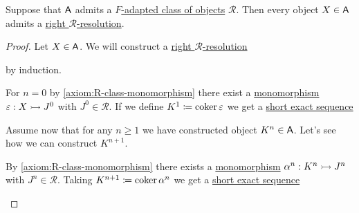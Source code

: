 \documentclass[../../../main]{subfiles}
\begin{document}
\begin{lemma}
  Suppose that \(\mathsf{A}\) admits a \hyperref[def:adapted-class-of-objects]{\(F\)-adapted class of objects} \(\mathcal{R}\).
  Then every object \(X \in \mathsf{A}\) admits a \hyperref[def:right-R-resolution]{right \(\mathcal{R}\)-resolution}.
\end{lemma}
\begin{proof}
  Let \(X \in \mathsf{A}\).
  We will construct a \hyperref[def:right-R-resolution]{right \(\mathcal{R}\)-resolution}
  \begin{center}
  \end{center}
  by induction.

  For \(n = 0\) by \ref{axiom:R-class-monomorphism} there exist a \hyperref[def:mono-epi-morphism]{monomorphism} \(\varepsilon: X \rightarrowtail J^{0}\) with \(J^{0} \in \mathcal{R}\).
  If we define \(K^{1} \coloneq \operatorname*{coker} \varepsilon\) we get a \hyperref[def:short-exact-sequence]{short exact sequence}
  \begin{center}
  \end{center}

  Assume now that for any \(n \geq 1\) we have constructed object \(K^{n} \in \mathsf{A}\).
  Let's see how we can construct \(K^{n+1}\).

  By \ref{axiom:R-class-monomorphism} there exists a \hyperref[def:mono-epi-morphism]{monomorphism} \(\alpha^{n}: K^{n} \rightarrowtail J^{n}\) with \(J^{n} \in \mathcal{R}\).
  Taking \(K^{n+1} \coloneq \operatorname*{coker} \alpha^{n}\) we get a \hyperref[def:short-exact-sequence]{short exact sequence}
  \begin{center}
  \end{center}


\end{proof}
\end{document}
